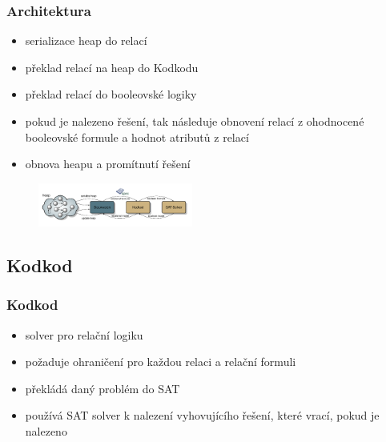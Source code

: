 \documentclass[czech]{beamer}
\begin{document}
\begin{frame}
  \frametitle{Architektura}   %
  \begin{itemize}
  \item serializace heap do relací
  \item překlad relací na heap do Kodkodu
  \item překlad relací do booleovské logiky
  \item pokud je nalezeno řešení, tak následuje obnovení relací z ohodnocené
  booleovské formule a hodnot atributů z relací
  \item obnova heapu a promítnutí
  řešení
  \end{itemize}
  \begin{figure}[h]
	\begin{center}
   	\includegraphics[width=2in]{img/architecture-diagram} 
   \end{center}
 \end{figure}
  
\end{frame}

\subsection{Kodkod}

\begin{frame}
  \frametitle{Kodkod}   %
  \begin{itemize}
  \item<1-> solver pro relační logiku
  \item<2-> požaduje ohraničení pro každou relaci a relační formuli
  \item<3-> překládá daný problém do SAT 
  \item<4-> používá SAT solver k nalezení vyhovujícího řešení, které vrací,
  pokud je nalezeno
  \end{itemize}
\end{frame}
\end{document}
